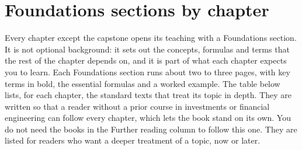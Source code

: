 \section*{Foundations sections by chapter}

Every chapter except the capstone opens its teaching with a Foundations section. It is not optional background: it sets out the concepts, formulas and terms that the rest of the chapter depends on, and it is part of what each chapter expects you to learn. Each Foundations section runs about two to three pages, with key terms in bold, the essential formulas and a worked example. The table below lists, for each chapter, the standard texts that treat its topic in depth. They are written so that a reader without a prior course in investments or financial engineering can follow every chapter, which lets the book stand on its own. You do not need the books in the Further reading column to follow this one. They are listed for readers who want a deeper treatment of a topic, now or later.

